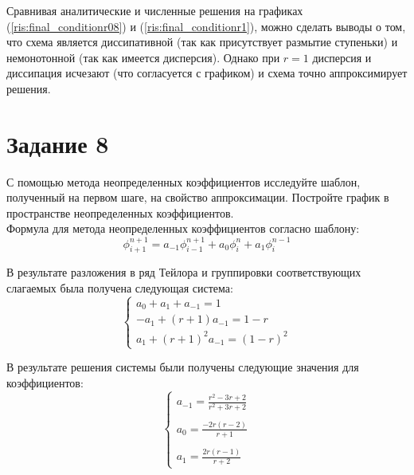 \documentclass[a4paper, 14pt]{extreport}
\begin{document}
\newpage Сравнивая аналитические и численные решения на графиках (\ref{ris:final_conditionr08}) и (\ref{ris:final_conditionr1}), можно сделать выводы о том, что схема является диссипативной (так как присутствует размытие ступеньки) и немонотонной (так как имеется дисперсия). Однако при $r = 1$ дисперсия и диссипация исчезают (что согласуется с графиком) и схема точно аппроксимирует решения.

\newpage
\section*{Задание 8}
С помощью метода неопределенных коэффициентов исследуйте шаблон, полученный на первом шаге, на свойство аппроксимации. Постройте график в пространстве неопределенных коэффициентов.\\

Формула для метода неопределенных коэффициентов согласно шаблону:
\begin{equation}
	\label{undef_coeff}
	\phi_{i+1}^{n+1} = a_{-1}\phi_{i-1}^{n+1}+a_0\phi_i^n+a_1\phi_i^{n-1}
\end{equation}

В результате разложения в ряд Тейлора и группировки соответствующих слагаемых была получена следующая система:
\begin{equation*}
	\begin{cases}
  	a_0+a_1+a_{-1} = 1
   	\\
   	-a_1+(r+1)a_{-1} = 1-r
   	\\
   	a_1+(r+1)^2a_{-1}=(1-r)^2
	\end{cases}
\end{equation*}

В результате решения системы были получены следующие значения для коэффициентов:
\begin{equation*}
	\begin{cases}
  	a_{-1} = \frac{r^2-3r+2}{r^2+3r+2}
   	\\\\
   	a_0 = \frac{-2r(r-2)}{r+1}
   	\\\\
   	a_1 = \frac{2r(r-1)}{r+2}
	\end{cases}
\end{equation*}
\end{document}

